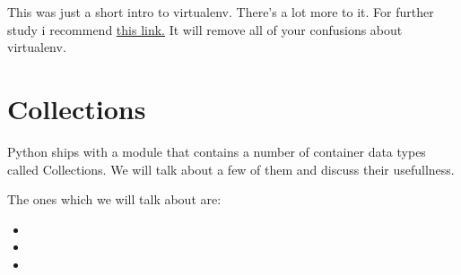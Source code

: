 \documentclass[a4paper,12pt,oneside]{sphinxmanual}
\begin{document}
This was just a short intro to virtualenv. There's a lot more to it. For
further study i recommend \href{http://docs.python-guide.org/en/latest/dev/virtualenvs.html}{this
link.}
It will remove all of your confusions about virtualenv.


\chapter{Collections}
\label{collections:collections}\label{collections::doc}
Python ships with a module that contains a number of container data
types called Collections. We will talk about a few of them and discuss
their usefullness.

The ones which we will talk about are:
\begin{itemize}
\item {} 

\item {} 

\item {} 

\end{itemize}
\end{document}
